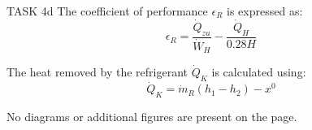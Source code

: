 TASK 4d  
The coefficient of performance \( \epsilon_R \) is expressed as:  
\[
\epsilon_R = \frac{\dot{Q}_{zu}}{\dot{W}_H} - \frac{\dot{Q}_H}{0.28H}
\]

The heat removed by the refrigerant \( \dot{Q}_K \) is calculated using:  
\[
\dot{Q}_K = \dot{m}_R (h_1 - h_2) - x^0
\]  

No diagrams or additional figures are present on the page.